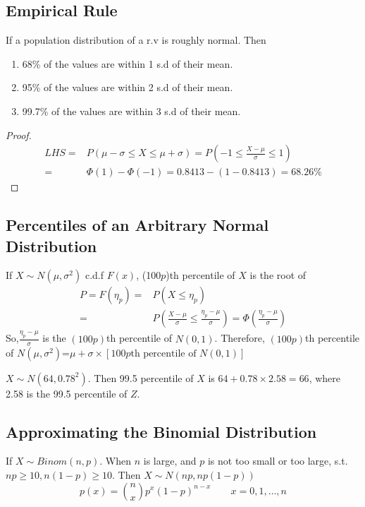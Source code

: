 \subsection{Empirical Rule}
If a population distribution of a r.v is roughly normal. Then
\begin{enumerate}
\item 68\% of the values are within 1 s.d of their mean.
\item 95\% of the values are within 2 s.d of their mean.
\item 99.7\% of the values are within 3 s.d of their mean.
\end{enumerate}
\begin{proof}
\begin{align*}
LHS=&P(\mu-\sigma \leq X \leq \mu+\sigma)=P(-1 \leq\frac{X-\mu}{\sigma}\leq 1)\\
=&\Phi(1)-\Phi(-1)=0.8413-(1-0.8413)=68.26\%
\end{align*}
\end{proof}

\subsection{Percentiles of an Arbitrary Normal Distribution}
If $X\sim N(\mu,\sigma^2)$ c.d.f $F(x)$, (100$p$)th percentile of $X$ is the root of 
\begin{align*}
P=F(\eta_p)=&P(X \leq \eta_p)\\ 
=&P\left(\frac{X-\mu}{\sigma} \leq \frac{\eta_p-\mu}{\sigma} \right)=\Phi\left( \frac{\eta_p-\mu}{\sigma} \right)
\end{align*}
So,$\frac{\eta_p-\mu}{\sigma}$ is the $(100p)$th percentile of $N(0,1)$. Therefore, $(100p)$th percentile of $N(\mu,\sigma^2)$=$\mu+\sigma\times[100p\text{th percentile of }N(0,1)]$

\begin{exmp}
$X \sim N(64,0.78^2)$. Then 99.5 percentile of $X$ is $64+0.78\times 2.58=66$, where 2.58 is the 99.5 percentile of $Z$. 
\end{exmp}

\subsection{Approximating the Binomial Distribution}
If $X \sim Binom(n,p)$. When $n$ is large, and $p$ is not too small or too large, s.t. $np \geq 10, n(1-p) \geq 10$. Then $X \sim N(np,np(1-p))$
\[p(x)=\binom nx p^x (1-p)^{n-x} \qquad x=0,1,\dots,n\]


